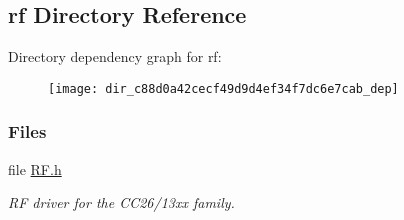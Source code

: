 \subsection{rf Directory Reference}
\label{dir_c88d0a42cecf49d9d4ef34f7dc6e7cab}
Directory dependency graph for rf\+:
\nopagebreak
\begin{figure}[H]
\begin{center}
\leavevmode
\texttt{[image: dir\_c88d0a42cecf49d9d4ef34f7dc6e7cab\_dep]}
\end{center}
\end{figure}
\subsubsection*{Files}
\begin{DoxyCompactItemize}
\item 
file \hyperlink{_r_f_8h}{R\+F.\+h}
\begin{DoxyCompactList}\small\item\em R\+F driver for the C\+C26/13xx family. \end{DoxyCompactList}\end{DoxyCompactItemize}
